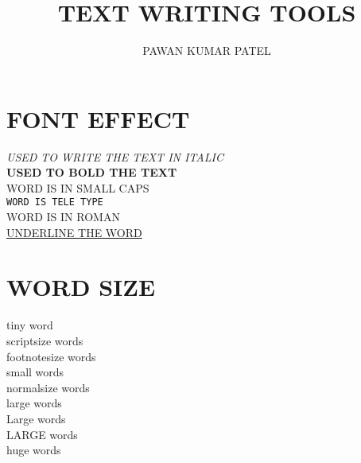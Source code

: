 \documentclass[a4paper,12pt]{article}
\begin{document}
\title{TEXT WRITING TOOLS}
\author { PAWAN KUMAR PATEL}
\maketitle
\newpage %



\section{ FONT EFFECT}
\textit{USED TO WRITE THE TEXT IN ITALIC }\\
\textbf{USED TO BOLD THE TEXT}\\

\textsc{WORD IS IN SMALL CAPS}\\
\texttt{WORD IS TELE TYPE}\\
\textrm{WORD IS IN ROMAN }\\[1CM]
\underline {UNDERLINE THE WORD}\\[2cm]



\section{WORD SIZE}
\tiny tiny word\\[2mm]
{\scriptsize scriptsize words}\\[2mm] %
{\footnotesize footnotesize words}\\[2mm]%
{\small small words}\\[2mm] %
{\normalsize normalsize words}\\[2mm]%
{\large large words}\\[2mm]%
{\Large Large words}\\[2mm]%
{\LARGE LARGE words}\\[2mm]%
{\huge huge words} \\[2mm]%
\end{document}
